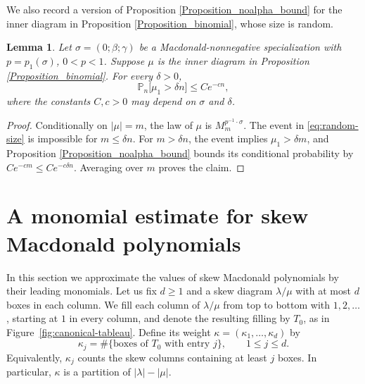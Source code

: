 \documentclass[11pt,reqno]{amsart}
\newtheorem{lemma}[theorem]{Lemma}
\theoremstyle{definition}
\theoremstyle{remark}
\numberwithin{equation}{section}
\newcommand{\Prob}{\mathbb P}
\begin{document}
We also record a version of Proposition \ref{Proposition_noalpha_bound} for the inner diagram in Proposition \ref{Proposition_binomial}, whose size is random.

\begin{lemma}\label{lem:random-size}
Let $\sigma=(0;\beta;\gamma)$ be a Macdonald-nonnegative specialization with
$p=p_1(\sigma)$, $0<p<1$. Suppose $\mu$ is the inner diagram in Proposition \ref{Proposition_binomial}. For every
$\delta>0$,
\begin{equation}\label{eq:random-size}
 \Prob_n\bigl[\mu_1>\delta n\bigr]\le Ce^{-cn},
\end{equation}
where the constants $C,c>0$ may depend on $\sigma$ and $\delta$.
\end{lemma}

\begin{proof} Conditionally on $|\mu|=m$,
the law of $\mu$ is $M_m^{p^{-1}\cdot\sigma}$. The event in \eqref{eq:random-size}
is impossible for $m\le\delta n$. For $m>\delta n$, the event implies
$\mu_1>\delta m$, and Proposition \ref{Proposition_noalpha_bound} bounds its conditional
probability by $Ce^{-cm}\le Ce^{-c\delta n}$. Averaging over $m$ proves
the claim.
\end{proof}

\section{A monomial estimate for skew Macdonald polynomials}
\label{Section_localization_to_monomial}

In this section we approximate the values of skew Macdonald polynomials by their leading monomials. Let us fix $d\ge1$ and a skew diagram $\lambda/\mu$ with at most $d$ boxes in each column. We fill each column of $\lambda/\mu$ from top to bottom with $1,2,\ldots$,
starting at $1$ in every column, and denote the resulting filling by
$T_0$, as in Figure~\ref{fig:canonical-tableau}. Define its weight $\kappa=(\kappa_1,\ldots,\kappa_d)$ by
\begin{equation}\label{eq:kappa}
 \kappa_j=\#\{\text{boxes of }T_0\text{ with entry }j\},
 \qquad 1\le j\le d.
\end{equation}
Equivalently, $\kappa_j$ counts the skew columns containing at least $j$
boxes. In particular, $\kappa$ is a partition of $|\lambda|-|\mu|$.
\end{document}
